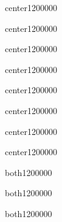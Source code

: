 \begin{WordParagraph}{center}{12}{}{0}{0}{0}{0}{0}
\WordAutoSpaceOn
\WordEmpty
\end{WordParagraph}

\begin{WordParagraph}{center}{12}{}{0}{0}{0}{0}{0}
\WordAutoSpaceOn
\WordEmpty
\end{WordParagraph}

\begin{WordParagraph}{center}{12}{}{0}{0}{0}{0}{0}
\WordAutoSpaceOn
\WordEmpty
\end{WordParagraph}

\begin{WordParagraph}{center}{12}{}{0}{0}{0}{0}{0}
\WordAutoSpaceOn
\WordEmpty
\end{WordParagraph}

\begin{WordParagraph}{center}{12}{}{0}{0}{0}{0}{0}
\WordAutoSpaceOn
\WordEmpty
\end{WordParagraph}

\begin{WordParagraph}{center}{12}{}{0}{0}{0}{0}{0}
\WordAutoSpaceOn
\WordEmpty
\end{WordParagraph}

\begin{WordParagraph}{center}{12}{}{0}{0}{0}{0}{0}
\WordAutoSpaceOn
\WordEmpty
\end{WordParagraph}

\begin{WordParagraph}{center}{12}{}{0}{0}{0}{0}{0}
\WordAutoSpaceOn
\WordEmpty
\end{WordParagraph}

\begin{WordParagraph}{both}{12}{}{0}{0}{0}{0}{0}
\WordAutoSpaceOn
\WordEmpty
\end{WordParagraph}

\begin{WordParagraph}{both}{12}{}{0}{0}{0}{0}{0}
\WordAutoSpaceOn
\WordEmpty
\end{WordParagraph}

\begin{WordParagraph}{both}{12}{}{0}{0}{0}{0}{0}
\WordAutoSpaceOn
\WordEmpty
\end{WordParagraph}

